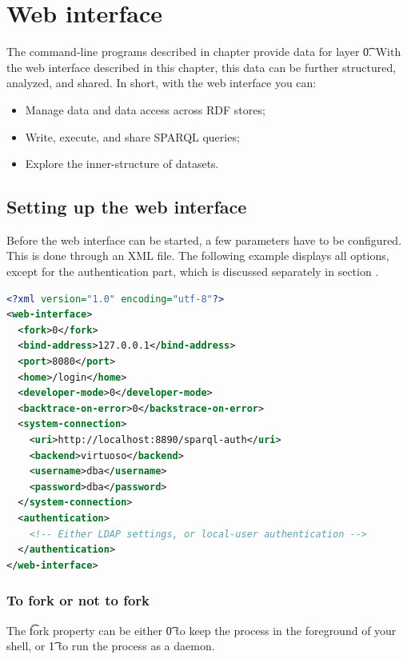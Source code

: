 \chapter{Web interface}
\label{chap:web-interface}

  The command-line programs described in chapter 
  provide data for layer \t{0}.  With the web interface described in
  this chapter, this data can be further structured, analyzed, and shared.
  In short, with the web interface you can:
  \begin{itemize}
  \item Manage data and data access across RDF stores;
  \item Write, execute, and share SPARQL queries;
  \item Explore the inner-structure of datasets.
  \end{itemize}

\section{Setting up the web interface}
\label{sec:configuring-sg-web}

  Before the web interface can be started, a few parameters have to be
  configured.  This is done through an XML file.  The following example
  displays all options, except for the authentication part, which is
  discussed separately in section .

\begin{lstlisting}[language=XML]
<?xml version="1.0" encoding="utf-8"?>
<web-interface>
  <fork>0</fork>
  <bind-address>127.0.0.1</bind-address>
  <port>8080</port>
  <home>/login</home>
  <developer-mode>0</developer-mode>
  <backtrace-on-error>0</backstrace-on-error>
  <system-connection>
    <uri>http://localhost:8890/sparql-auth</uri>
    <backend>virtuoso</backend>
    <username>dba</username>
    <password>dba</password>
  </system-connection>
  <authentication>
    <!-- Either LDAP settings, or local-user authentication -->
  </authentication>
</web-interface>
\end{lstlisting}

\subsection{To fork or not to fork}

  The \t{fork} property can be either \t{0} to keep the
   process in the foreground of your shell, or
  \t{1} to run the  process as a daemon.

